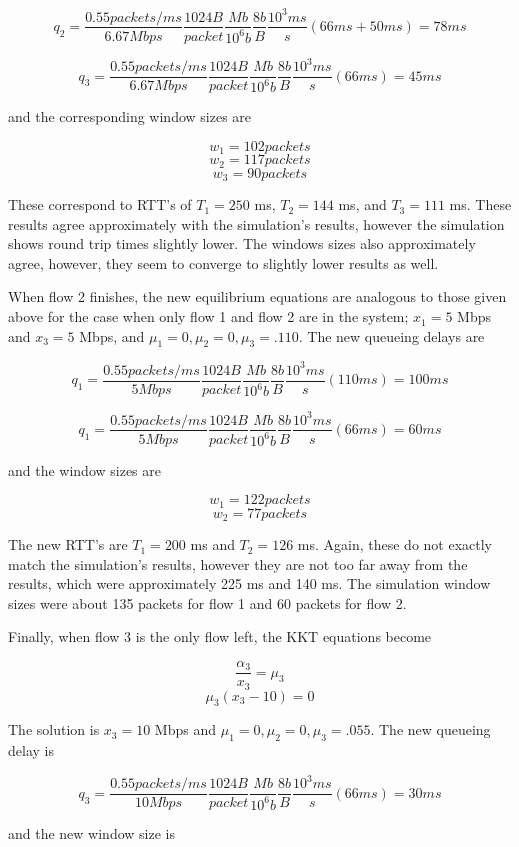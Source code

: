 \documentclass{article}
\begin{document}
$$q_2 = \frac{0.55 packets/ms}{6.67 Mbps} \frac{1024 B}{packet} \frac{Mb}{10^6 b} \frac{8 b}{B} \frac{10^3 ms}{s} (66 ms + 50 ms) = 78 ms$$

$$q_3 = \frac{0.55 packets/ms}{6.67 Mbps} \frac{1024 B}{packet} \frac{Mb}{10^6 b} \frac{8 b}{B} \frac{10^3 ms}{s} (66 ms) = 45 ms$$

and the corresponding window sizes are

$$w_1 = 102 packets$$
$$w_2 = 117 packets$$
$$w_3 = 90 packets $$

These correspond to RTT's of $T_1 = 250$ ms, $T_2 = 144$ ms, and $T_3 = 111$ ms. These results agree approximately with the simulation's results, however the simulation shows round trip times slightly lower. The windows sizes also approximately agree, however, they seem to converge to slightly lower results as well.

When flow 2 finishes, the new equilibrium equations are analogous to those given above for the case when only flow 1 and flow 2 are in the system; $x_1 = 5$ Mbps and $x_3 = 5$ Mbps, and $\mu_1 = 0, \mu_2 = 0, \mu_3 = .110$. The new queueing delays are 

$$q_1 = \frac{0.55 packets/ms}{5 Mbps} \frac{1024 B}{packet} \frac{Mb}{10^6 b} \frac{8 b}{B} \frac{10^3 ms}{s} (110 ms) = 100 ms$$

$$q_1 = \frac{0.55 packets/ms}{5 Mbps} \frac{1024 B}{packet} \frac{Mb}{10^6 b} \frac{8 b}{B} \frac{10^3 ms}{s} (66 ms) = 60 ms$$

and the window sizes are

$$w_1 = 122 packets$$
$$w_2 = 77 packets$$

The new RTT's are $T_1 = 200$ ms and $T_2 = 126$ ms. Again, these do not exactly match the simulation's results, however they are not too far away from the results, which were approximately 225 ms and 140 ms. The simulation window sizes were about 135 packets for flow 1 and 60 packets for flow 2.

Finally, when flow 3 is the only flow left, the KKT equations become

$$\frac{\alpha_3}{x_3}=\mu_3$$
$$\mu_3 (x_3 - 10) = 0$$

The solution is $x_3 = 10$ Mbps and $\mu_1 = 0, \mu_2 = 0, \mu_3 = .055$. The new queueing delay is 

$$q_3 = \frac{0.55 packets/ms}{10 Mbps} \frac{1024 B}{packet} \frac{Mb}{10^6 b} \frac{8 b}{B}  \frac{10^3 ms}{s} (66 ms) = 30 ms$$

and the new window size is
\end{document}
